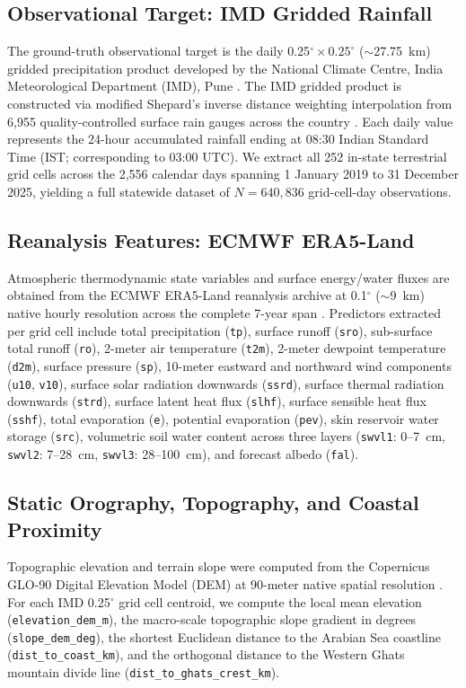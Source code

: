 \documentclass[12pt]{article}
\begin{document}
\subsection{Observational Target: IMD Gridded Rainfall}
The ground-truth observational target is the daily 0.25$^\circ \times 0.25^\circ$ ($\sim$27.75~km) gridded precipitation product developed by the National Climate Centre, India Meteorological Department (IMD), Pune \cite{pai2014}. The IMD gridded product is constructed via modified Shepard's inverse distance weighting interpolation from 6,955 quality-controlled surface rain gauges across the country \cite{rajeevan2006}. Each daily value represents the 24-hour accumulated rainfall ending at 08:30 Indian Standard Time (IST; corresponding to 03:00 UTC). We extract all 252 in-state terrestrial grid cells across the 2,556 calendar days spanning 1 January 2019 to 31 December 2025, yielding a full statewide dataset of $N = 640,836$ grid-cell-day observations.

\subsection{Reanalysis Features: ECMWF ERA5-Land}
Atmospheric thermodynamic state variables and surface energy/water fluxes are obtained from the ECMWF ERA5-Land reanalysis archive at 0.1$^\circ$ ($\sim$9~km) native hourly resolution across the complete 7-year span \cite{munoz2021}. Predictors extracted per grid cell include total precipitation (\texttt{tp}), surface runoff (\texttt{sro}), sub-surface total runoff (\texttt{ro}), 2-meter air temperature (\texttt{t2m}), 2-meter dewpoint temperature (\texttt{d2m}), surface pressure (\texttt{sp}), 10-meter eastward and northward wind components (\texttt{u10}, \texttt{v10}), surface solar radiation downwards (\texttt{ssrd}), surface thermal radiation downwards (\texttt{strd}), surface latent heat flux (\texttt{slhf}), surface sensible heat flux (\texttt{sshf}), total evaporation (\texttt{e}), potential evaporation (\texttt{pev}), skin reservoir water storage (\texttt{src}), volumetric soil water content across three layers (\texttt{swvl1}: 0--7~cm, \texttt{swvl2}: 7--28~cm, \texttt{swvl3}: 28--100~cm), and forecast albedo (\texttt{fal}).

\subsection{Static Orography, Topography, and Coastal Proximity}
Topographic elevation and terrain slope were computed from the Copernicus GLO-90 Digital Elevation Model (DEM) at 90-meter native spatial resolution \cite{copernicus2020}. For each IMD 0.25$^\circ$ grid cell centroid, we compute the local mean elevation (\texttt{elevation\_dem\_m}), the macro-scale topographic slope gradient in degrees (\texttt{slope\_dem\_deg}), the shortest Euclidean distance to the Arabian Sea coastline (\texttt{dist\_to\_coast\_km}), and the orthogonal distance to the Western Ghats mountain divide line (\texttt{dist\_to\_ghats\_crest\_km}).
\end{document}
